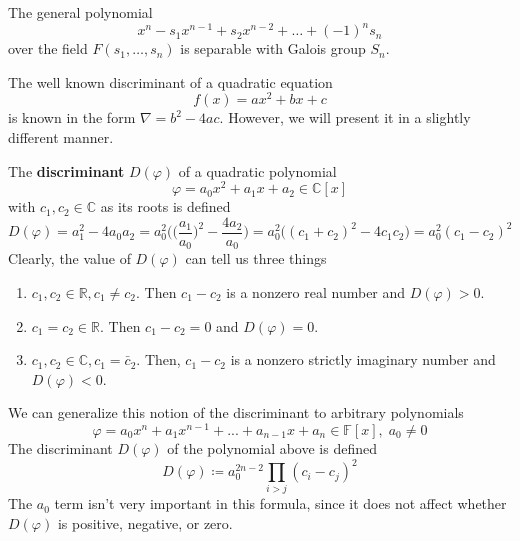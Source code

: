   \begin{theorem}
    \label{thm:general-polynomial-over-field-separable}
    The general polynomial 
    \begin{equation}
      x^n - s_1 x^{n-1} + s_2 x^ {n-2} + \ldots + (-1)^n s_n 
    \end{equation}
    over the field $F(s_1, \ldots, s_n)$ is separable with Galois group $S_n$. 
  \end{theorem}

  The well known discriminant of a quadratic equation 
  \begin{equation}
    f(x) = ax^2 + bx + c
  \end{equation}
  is known in the form $\nabla = b^2 - 4ac$. However, we will present it in a slightly different manner. 

  \begin{definition}
    \label{def:discriminant}
    The \textbf{discriminant} $D(\varphi)$ of a quadratic polynomial
    \begin{equation}
      \varphi = a_0 x^2 + a_1 x + a_2 \in \mathbb{C}[x]
    \end{equation}
    with $c_1, c_2 \in \mathbb{C}$ as its roots is defined
    \begin{equation}
      D(\varphi) = a_1^2 - 4 a_0 a_2 = a_0^2 \bigg( \Big(\frac{a_1}{a_0} \Big)^2 - \frac{4 a_2}{a_0} \bigg) = a_0^2 \big( (c_1 + c_2)^2 - 4 c_1 c_2 \big) = a_0^2 (c_1 - c_2)^2
    \end{equation}
    Clearly, the value of $D(\varphi)$ can tell us three things
    \begin{enumerate}
      \item $c_1, c_2 \in \mathbb{R}, c_1 \neq c_2$. Then $c_1 - c_2$ is a nonzero real number and $D(\varphi) > 0$. 
      \item $c_1 = c_2 \in \mathbb{R}$. Then $c_1 - c_2 = 0$ and $D(\varphi) = 0$. 
      \item $c_1, c_2 \in \mathbb{C}, c_1 = \bar{c}_2$. Then, $c_1 - c_2$ is a nonzero strictly imaginary number and $D(\varphi) < 0$. 
    \end{enumerate}
  \end{definition}

  \begin{definition}
    \label{def:generalize-notion-discriminant-arbitrary}
    We can generalize this notion of the discriminant to arbitrary polynomials
    \begin{equation}
      \varphi = a_0 x^n + a_1 x^{n-1} + ... + a_{n-1} x + a_n \in \mathbb{F}[x], \; a_0 \neq 0
    \end{equation}
    The discriminant $D(\varphi)$ of the polynomial above is defined
    \begin{equation}
      D(\varphi) \coloneqq a_0^{2n-2} \prod_{i>j} (c_i - c_j)^2
    \end{equation}
    The $a_0$ term isn't very important in this formula, since it does not affect whether $D(\varphi)$ is positive, negative, or zero. 
  \end{definition}

